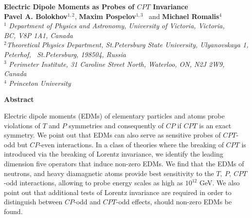 \documentclass[prl,twocolumn,tightenlines,preprintnumbers,floatfix,nofootinbib]{revtex4}
\renewcommand{\thefootnote}{\fnsymbol{footnote}}
\renewcommand{\thefootnote}{\arabic{footnote}}
\begin{document}

\setcounter{page}{1}


\begin{titlepage}
\renewcommand{\thefootnote}{\fnsymbol{footnote}}

\begin{center}
\vspace{0.5cm}

\large {\bf Electric Dipole Moments as Probes of $CPT$ Invariance}\\[3mm]
  
\vspace*{0.5cm}
\normalsize
{\bf Pavel A. Bolokhov}$^{1,2}$,
{\bf Maxim Pospelov}$^{1,3}$%
\ and
{\bf Michael Romalis}$^{4}$\\
\vspace*{0.5cm}
$^{1}$ {\it Department of Physics and Astronomy,
University of Victoria, Victoria,\\ BC, V8P 1A1, Canada}\\
$^{2}${\it Theoretical Physics Department, St.Petersburg State University, Ulyanovskaya 1,\\
Peterhof, ~St.Petersburg, 198504, Russia}\\
$^{3}$ {\it Perimeter Institute, 31 Caroline Street North,
Waterloo, ON,  N2J 2W9,
Canada}\\
$^{4}$ {\it Princeton University}
 \end{center}

\centerline{\large\bf Abstract}
Electric dipole moments (EDMs) of elementary particles and atoms probe violations of 
$T$ and $P$ symmetries and consequently of $CP$ if $CPT$ is an exact symmetry. 
We point out that EDMs can also serve as sensitive probes of $CPT$-odd but $CP$-even
interactions. In a class of theories where the breaking of $CPT$ is 
introduced via the breaking of Lorentz invariance, we identify the leading 
dimension five operators that induce non-zero EDMs. We find that the EDMs of neutrons, 
and heavy diamagnetic atoms provide best sensitivity to the $T,~P,~CPT$-odd interactions, 
allowing to probe energy scales as high as $10^{12}$ GeV. 
We also point out that additional tests of Lorentz invariance 
are required in order to distinguish between $CP$-odd and $CPT$-odd 
effects, should non-zero EDMs be found. 
\end{titlepage}

\tighten
\end{document}
